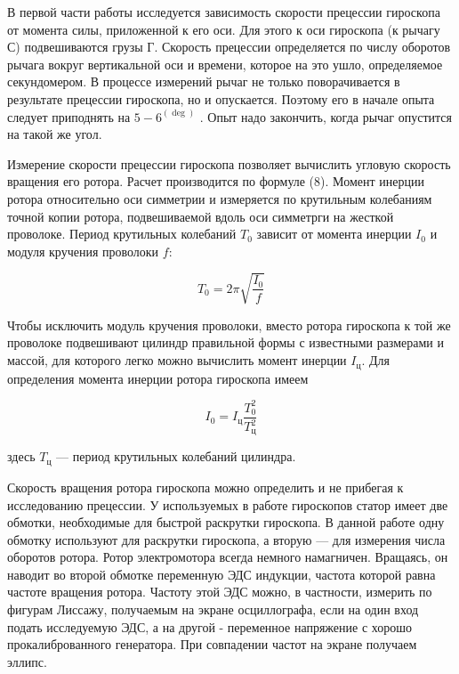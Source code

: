 \documentclass[14pt]{article}
\begin{document}
В первой части работы исследуется зависимость скорости прецессии гироскопа от момента силы, приложенной к его оси. Для этого к оси гироскопа (к рычагу С) подвешиваются грузы Г. Скорость прецессии определяется по числу оборотов рычага вокруг вертикальной оси и времени, которое на это ушло, определяемое секундомером. В процессе измерений рычаг не только поворачивается в результате прецессии гироскопа, но и опускается. Поэтому его в начале опыта следует приподнять на $5-6^(\deg)$ . Опыт надо закончить, когда рычаг опустится на такой же угол.

Измерение скорости прецессии гироскопа позволяет вычислить угловую скорость вращения его ротора. Расчет производится по формуле (8). Момент инерции ротора относительно оси симметрии и измеряется по крутильным колебаниям точной копии ротора, подвешиваемой вдоль оси симметрги на жесткой проволоке. Период крутильных колебаний $T_0$ зависит от момента инерции $I_0$ и модуля кручения проволоки $f$:

\begin{equation}
T_0 = 2\pi\sqrt{\frac{I_0}{f}}
\end{equation}

Чтобы исключить модуль кручения проволоки, вместо ротора гироскопа к той же проволоке подвешивают цилиндр правильной формы с известными размерами и массой, для которого легко можно вычислить момент инерции $I_{\text{ц}}$. Для определения момента инерции ротора гироскопа имеем

\begin{equation}
I_0 = I_{\text{ц}}\frac{T_0^2}{T_{\text{ц}}^2}
\end{equation}

\noindent здесь $T_{\text{ц}}$ --- период крутильных колебаний цилиндра.

Скорость вращения ротора гироскопа можно определить и не прибегая к исследованию прецессии. У используемых в работе гироскопов статор имеет две обмотки, необходимые для быстрой раскрутки гироскопа. В данной работе одну обмотку используют для раскрутки гироскопа, а вторую --- для измерения числа оборотов ротора. Ротор электромотора всегда немного намагничен. Вращаясь, он наводит во второй обмотке переменную ЭДС индукции,
частота которой равна частоте вращения ротора. Частоту этой ЭДС можно, в частности, измерить по фигурам Лиссажу, получаемым на экране осциллографа, если на один вход подать исследуемую ЭДС, а на другой - переменное напряжение с хорошо прокалиброванного генератора. При совпадении частот на экране получаем эллипс.
\end{document}
